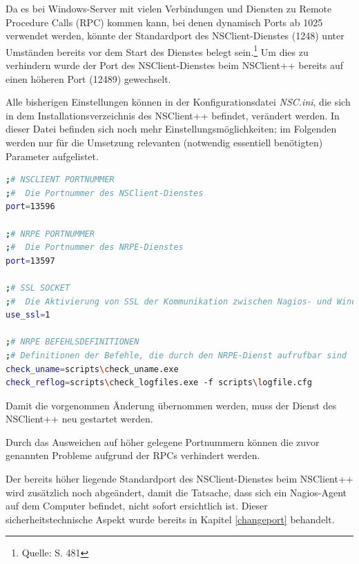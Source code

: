 Da es bei Windows-Server mit vielen Verbindungen und Diensten zu Remote Procedure Calls (\gls{RPC}) kommen kann, bei denen dynamisch Ports ab 1025 verwendet werden, könnte der Standardport des NSClient-Dienstes (1248) unter Umständen bereits vor dem Start des Dienstes belegt sein.\footnote{Quelle: \cite{Barth08} S. 481}
Um dies zu verhindern wurde der Port des NSClient-Dienstes beim NSClient++ bereits auf einen höheren Port (12489) gewechselt.

Alle bisherigen Einstellungen können in der Konfigurationsdatei \textit{NSC.ini}, die sich in dem Installationsverzeichnis des NSClient++ befindet, verändert werden.
In dieser Datei befinden sich noch mehr Einstellungsmöglichkeiten; im Folgenden werden nur für die Umsetzung relevanten (notwendig essentiell benötigten) Parameter aufgelistet.

\begin{lstlisting}[captionpos=b, caption=NSClient++ Konfigurationsdatei, label=code:nsc, breaklines = true, language=sh]
;# NSCLIENT PORTNUMMER
;#  Die Portnummer des NSClient-Dienstes
port=13596

;# NRPE PORTNUMMER
;#  Die Portnummer des NRPE-Dienstes
port=13597

;# SSL SOCKET
;#  Die Aktivierung von SSL der Kommunikation zwischen Nagios- und Windows-Server 
use_ssl=1

;# NRPE BEFEHLSDEFINITIONEN
;# Definitionen der Befehle, die durch den NRPE-Dienst aufrufbar sind
check_uname=scripts\check_uname.exe
check_reflog=scripts\check_logfiles.exe -f scripts\logfile.cfg
\end{lstlisting}

Damit die vorgenommen Änderung übernommen werden, muss der Dienst des NSClient++ neu gestartet werden. 


Durch das Ausweichen auf höher gelegene Portnummern können die zuvor genannten Probleme aufgrund der \gls{RPC}s verhindert werden.

Der bereits höher liegende Standardport des NSClient-Dienstes beim NSClient++ wird zusätzlich noch abgeändert, damit die Tatsache, dass sich ein Nagios-Agent auf dem Computer befindet, nicht sofort ersichtlich ist.
Dieser sicherheitstechnische Aspekt wurde bereits in Kapitel \ref{changeport} behandelt.

